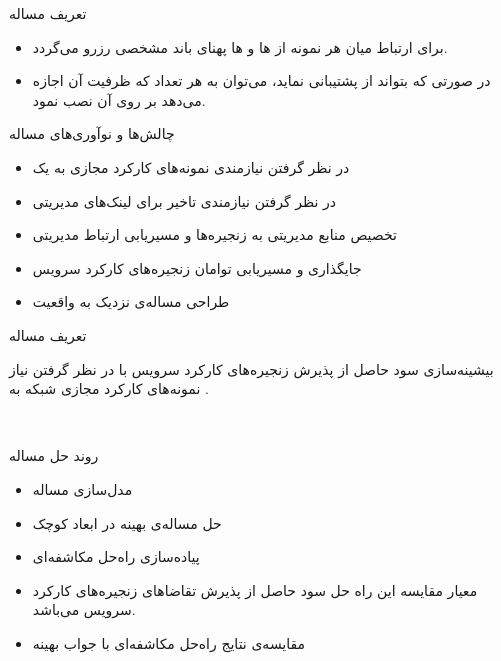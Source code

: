\documentclass{beamer}
\makeatletter
\newcommand{\RTList}{\raggedleft\rightskip\@totalleftmargin}
\makeatother
\begin{document}
\begin{persian}
\begin{frame}{تعریف مساله}
\begin{itemize}
        \item برای ارتباط میان هر نمونه از ها و ها پهنای باند مشخصی رزرو می‌گردد.
        \item در صورتی که  بتواند از  پشتیبانی نماید،
        می‌توان به هر تعداد که ظرفیت آن اجازه می‌دهد بر روی آن  نصب نمود.
    \end{itemize}
\end{frame}
\begin{frame}{چالش‌ها و نوآوری‌های مساله}
    \begin{itemize}\RTList{}
        \justifying
        \item در نظر گرفتن نیازمندی نمونه‌های کارکرد مجازی به یک 
        \item در نظر گرفتن نیازمندی تاخیر برای لینک‌های مدیریتی
        \item تخصیص منابع مدیریتی به زنجیره‌ها و مسیریابی ارتباط مدیریتی
        \item جایگذاری و مسیریابی توامان زنجیره‌های کارکرد سرویس
        \item طراحی مساله‌ی نزدیک به واقعیت
    \end{itemize}
\end{frame}
\begin{frame}{تعریف مساله}
    \begin{block}{}
        بیشینه‌سازی سود حاصل از پذیرش زنجیره‌های کارکرد سرویس با در نظر گرفتن نیاز نمونه‌های کارکرد
        مجازی شبکه به .
    \end{block}
\end{frame}‌
\begin{frame}{روند حل مساله}
    \begin{itemize}\RTList{}
        \justifying
        \item مدل‌سازی مساله
        \item حل مساله‌ی بهینه در ابعاد کوچک
        \item پیاده‌سازی راه‌حل مکاشفه‌ای
        \item معیار مقایسه این راه حل سود حاصل از پذیرش تقاضاهای زنجیره‌های کارکرد سرویس می‌باشد.
        \item مقایسه‌ی نتایج راه‌حل مکاشفه‌ای با جواب بهینه
    \end{itemize}
\end{frame}
\begin{frame}{}

\end{frame}
\end{persian}
\end{document}
